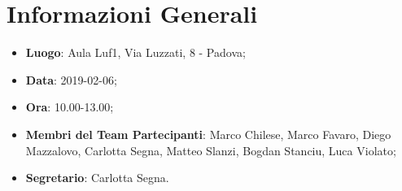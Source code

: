 \section{Informazioni Generali}

\begin{itemize}
	\item \textbf{Luogo}: Aula Luf1, Via Luzzati, 8 - Padova; 
	\item \textbf{Data}: 2019-02-06; 
	\item \textbf{Ora}: 10.00-13.00; 
	\item \textbf{Membri del Team Partecipanti}: Marco Chilese, Marco Favaro, Diego Mazzalovo, Carlotta Segna, Matteo Slanzi, Bogdan Stanciu, Luca Violato; 
	\item \textbf{Segretario}: Carlotta Segna. 
\end{itemize}